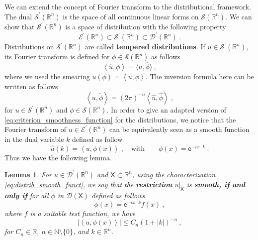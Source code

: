 \documentclass[11pt]{book}
\newcommand{\abs}[1]{\left|#1\right|}
\newcommand{\sm}[1]{\left\langle#1\right\rangle}
\newcommand{\Dcal}{\mathcal{D}}
\newcommand{\Ecal}{\mathcal{E}}
\newcommand{\Scal}{\mathcal{S}}
\newcommand{\Nbb}{\mathbb{N}}
\newcommand{\Rbb}{\mathbb{R}}
\newcommand{\Xsf}{\mathsf{X}}
\newcommand{\esf}{\mathsf{e}}
\theoremstyle{break}
\newtheorem{lemma}{Lemma}[chapter]
\begin{document}
We can extend the concept of Fourier transform to the distributional framework. The dual $\Scal^\prime(\Rbb^n)$ is the space of all continuous linear forms on $\Scal(\Rbb^n)$. We can show that $\Scal^\prime(\Rbb^n)$ is a space of distribution with the following property
%
\begin{equation*}
\Ecal^\prime(\Rbb^n) \subset \Scal^\prime(\Rbb^n) \subset \Dcal^\prime(\Rbb^n) \ .
\end{equation*}
%
Distributions on $\Scal^\prime(\Rbb^n)$ are called \textbf{tempered distributions}. If $u \in \Scal^\prime(\Rbb^n)$, its Fourier transform is defined for $\phi \in \Scal(\Rbb^n)$ as follows
%
\begin{equation}
\sm{\hat{u},\phi} = \langle u,\hat{\phi}\rangle \ ,
\label{eq:fourier_distrib}
\end{equation}
%
where we used the smearing $u(\phi) = \sm{u,\phi}$. The inversion formula here can be written as follows
%
\begin{equation}
\sm{u,\check{\phi}} = (2\pi)^{-n} \sm{\hat{u} , \hat{\phi}} \ ,
\label{eq:inversion_fourier_distrib}
\end{equation}
%
for $u \in \Scal^\prime(\Rbb^ n)$ and $\phi \in \Scal(\Rbb^n)$. In order to give an adapted version of \eqref{eq:criterion_smoothness_function}  for the distributions, we notice that the Fourier transform of $u \in \Ecal^\prime(\Rbb^n)$ can be equivalently seen as a smooth function in the dual variable $k$ defined as follow
%
\begin{equation}
\hat{u}(k) = \sm{ u , \phi(x) } \ , \quad \mbox{with} \qquad \phi(x) = \esf^{-i x \cdot k} \ .
\label{eq:distrib_smooth_funct}
\end{equation}
%
Thus we have the following lemma.


\begin{lemma}\label{lem:smooth_criterion_distrib}
For $u \in \Dcal^\prime(\Rbb^n)$ and $\Xsf \subset \Rbb^n$, using the characterization \eqref{eq:distrib_smooth_funct}, we say that the \textbf{restriction} $\left.u\right|_{\Xsf}$ is \textbf{smooth, if and only if} for all $\phi$ in $\Dcal(\Xsf)$ defined as follows
%
\begin{equation*}
\phi(x) = \esf^{-i x \cdot k} f(x) \ ,
\end{equation*}
%
where $f$ is a suitable test function, we have 
%
\begin{equation}
\abs{\sm{ u , \phi(x) }} \leq C_n (1+\abs{k})^{-n} \ , 
\label{eq:smooth_criterion_distrib}
\end{equation}
for $C_n \in \Rbb$, $n \in \Nbb \setminus \{0\}$, and $k\in \Rbb^n$.
\end{lemma}
\end{document}
